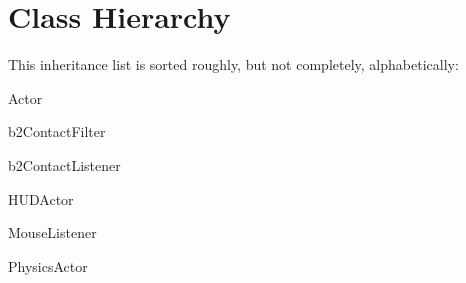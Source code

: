 \section{Class Hierarchy}
This inheritance list is sorted roughly, but not completely, alphabetically\+:\begin{DoxyCompactList}
\item Actor\begin{DoxyCompactList}
\item {}
\end{DoxyCompactList}
\item b2\+Contact\+Filter\begin{DoxyCompactList}
\item {}
\end{DoxyCompactList}
\item b2\+Contact\+Listener\begin{DoxyCompactList}
\item {}
\end{DoxyCompactList}
\item {}
\item {}
\item H\+U\+D\+Actor\begin{DoxyCompactList}
\item {}
\end{DoxyCompactList}
\item {}
\item {}
\item {}
\item {}
\item {}
\item Mouse\+Listener\begin{DoxyCompactList}
\item {}
\end{DoxyCompactList}
\item Physics\+Actor\begin{DoxyCompactList}

\end{DoxyCompactList}
\end{DoxyCompactList}

